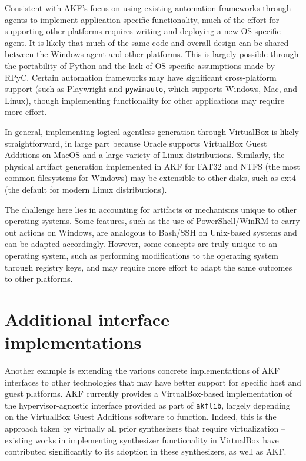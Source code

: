 \documentclass[letterpaper,12pt]{report}
\newcommand{\passthrough}[1]{#1}
\begin{document}
Consistent with AKF's focus on using existing automation frameworks
through agents to implement application-specific functionality, much of
the effort for supporting other platforms requires writing and deploying
a new OS-specific agent. It is likely that much of the same code and
overall design can be shared between the Windows agent and other
platforms. This is largely possible through the portability of Python
and the lack of OS-specific assumptions made by RPyC. Certain automation
frameworks may have significant cross-platform support (such as
Playwright and \passthrough{\lstinline!pywinauto!}, which supports
Windows, Mac, and Linux), though implementing functionality for other
applications may require more effort.

In general, implementing logical agentless generation through VirtualBox
is likely straightforward, in large part because Oracle supports
VirtualBox Guest Additions on MacOS and a large variety of Linux
distributions. Similarly, the physical artifact generation implemented
in AKF for FAT32 and NTFS (the most common filesystems for Windows) may
be extensible to other disks, such as ext4 (the default for modern Linux
distributions).

The challenge here lies in accounting for artifacts or mechanisms unique
to other operating systems. Some features, such as the use of
PowerShell/WinRM to carry out actions on Windows, are analogous to
Bash/SSH on Unix-based systems and can be adapted accordingly. However,
some concepts are truly unique to an operating system, such as
performing modifications to the operating system through registry keys,
and may require more effort to adapt the same outcomes to other
platforms.

\section{Additional interface
implementations}\label{additional-interface-implementations}

Another example is extending the various concrete implementations of AKF
interfaces to other technologies that may have better support for
specific host and guest platforms. AKF currently provides a
VirtualBox-based implementation of the hypervisor-agnostic interface
provided as part of \passthrough{\lstinline!akflib!}, largely depending
on the VirtualBox Guest Additions software to function. Indeed, this is
the approach taken by virtually all prior synthesizers that require
virtualization -- existing works in implementing synthesizer
functionality in VirtualBox have contributed significantly to its
adoption in these synthesizers, as well as AKF.
\end{document}
